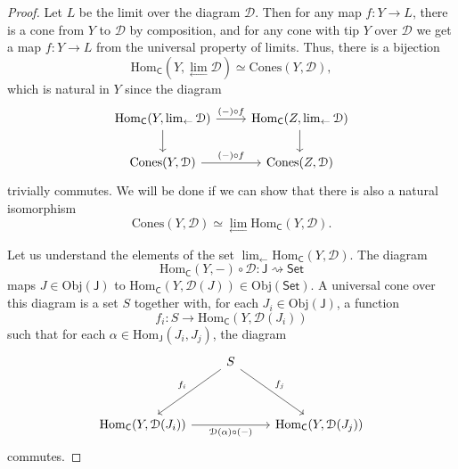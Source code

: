 \documentclass[a4paper]{report}
\newcommand{\Obj}{\mathrm{Obj}}
\newcommand{\Hom}{\mathrm{Hom}}
\theoremstyle{definition}
\theoremstyle{plain}
\theoremstyle{remark}
\begin{document}
\begin{proof}
  Let $L$ be the limit over the diagram $\mathcal{D}$. Then for any map $f\colon Y \to L$, there is a cone from $Y$ to $\mathcal{D}$ by composition, and for any cone with tip $Y$ over $\mathcal{D}$ we get a map $f\colon Y \to L$ from the universal property of limits. Thus, there is a bijection
  \begin{equation*}
    \Hom_{\mathsf{C}}(Y, \lim_{\leftarrow}\mathcal{D}) \simeq \mathrm{Cones}(Y, \mathcal{D}),
  \end{equation*}
  which is natural in $Y$ since the diagram
  \begin{equation*}
    \begin{tikzcd}
      \Hom_{\mathsf{C}}(Y, \lim_{\leftarrow}\mathcal{D})
      \arrow[r, "(-) \circ f"]
      \arrow[d]
      & \Hom_{\mathsf{C}}(Z, \lim_{\leftarrow}\mathcal{D})
      \arrow[d]
      \\
      \mathrm{Cones}(Y, \mathcal{D})
      \arrow[r, "(-) \circ f"]
      & \mathrm{Cones}(Z, \mathcal{D})
    \end{tikzcd}
  \end{equation*}
  trivially commutes. We will be done if we can show that there is also a natural isomorphism
  \begin{equation*}
    \mathrm{Cones}(Y, \mathcal{D}) \simeq \lim_{\leftarrow} \Hom_{\mathsf{C}}(Y, \mathcal{D}).
  \end{equation*}

  Let us understand the elements of the set $\lim_{\leftarrow}\Hom_{\mathsf{C}}(Y, \mathcal{D})$. The diagram 
  \begin{equation*}
    \Hom_{\mathsf{C}}(Y, -) \circ \mathcal{D} \colon \mathsf{J} \rightsquigarrow \mathsf{Set}
  \end{equation*}
  maps $J \in \Obj(\mathsf{J})$ to $\Hom_{\mathsf{C}}(Y, \mathcal{D}(J)) \in \Obj(\mathsf{Set})$. A universal cone over this diagram is a set $S$ together with, for each $J_{i} \in \Obj(\mathsf{J})$, a function
  \begin{equation*}
    f_{i}\colon S \to \Hom_{\mathsf{C}}(Y, \mathcal{D}(J_{i}))
  \end{equation*}
  such that for each $\alpha \in \Hom_{\mathsf{J}}(J_{i}, J_{j})$, the diagram
  \begin{equation*}
    \begin{tikzcd}[row sep=huge]
      & S
      \arrow[dl, swap, "f_{i}"]
      \arrow[dr, "f_{j}"]
      \\
      \Hom_{\mathsf{C}}(Y, \mathcal{D}(J_{i}))
      \arrow[rr, swap, "\mathcal{D}(\alpha) \circ (-)"]
      & & \Hom_{\mathsf{C}}(Y, \mathcal{D}(J_{j}))
    \end{tikzcd}
  \end{equation*}
  commutes.


\end{proof}
\end{document}
